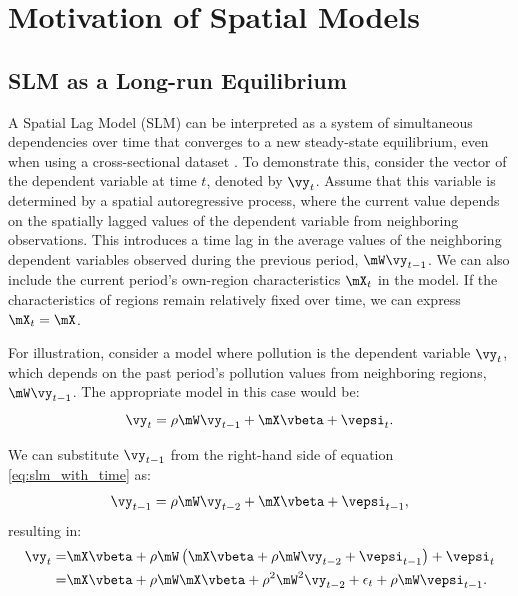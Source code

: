 \documentclass[english,12pt]{book}\usepackage[]{graphicx}\usepackage[]{xcolor}
\begin{document}
\section{Motivation of Spatial Models}\label{sec:motivation}

\subsection{SLM as a Long-run Equilibrium}\label{sec:SLM_lre}

A Spatial Lag Model (SLM) can be interpreted as a system of simultaneous dependencies over time that converges to a new steady-state equilibrium, even when using a cross-sectional dataset \citep{lesage2010introduction}. To demonstrate this, consider the vector of the dependent variable at time $t$, denoted by $\vy_t$. Assume that this variable is determined by a spatial autoregressive process, where the current value depends on the spatially lagged values of the dependent variable from neighboring observations. This introduces a time lag in the average values of the neighboring dependent variables observed during the previous period, $\mW\vy_{t-1}$. We can also include the current period's own-region characteristics $\mX_t$ in the model. If the characteristics of regions remain relatively fixed over time, we can express $\mX_t = \mX$.

For illustration, consider a model where pollution is the dependent variable $\vy_t$, which depends on the past period's pollution values from neighboring regions, $\mW\vy_{t-1}$. The appropriate model in this case would be:
\begin{equation}\label{eq:slm_with_time}
\vy_t = \rho \mW\vy_{t-1} + \mX\vbeta + \vepsi_t.
\end{equation}

We can substitute $\vy_{t-1}$ from the right-hand side of equation \eqref{eq:slm_with_time} as:
\begin{equation*}
\vy_{t-1} = \rho \mW\vy_{t-2} + \mX\vbeta + \vepsi_{t-1},
\end{equation*}
%
resulting in:
\begin{equation}\label{eq:recur_2}
\begin{aligned}
\vy_t  = & \mX\vbeta +\rho\mW\left(\mX\vbeta + \rho \mW\vy_{t-2} + \vepsi_{t-1}\right) + \vepsi_t\\
=& \mX\vbeta +\rho\mW\mX\vbeta + \rho^2\mW^2\vy_{t-2} + \epsilon_t + \rho\mW\vepsi_{t-1}.
\end{aligned}
\end{equation}
\end{document}
